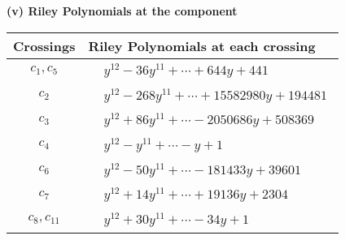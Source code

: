 \documentclass[1p]{elsarticle_modified}
\theoremstyle{definition}
\begin{document}
\newpage\renewcommand{\arraystretch}{1}
\flushleft \textbf{(v) Riley Polynomials at the component}\newline \\
\begin{tabular}{m{50pt}|m{274pt}}
Crossings & \hspace{64pt}Riley Polynomials at each crossing \\
\hline $$\begin{aligned}c_{1},c_{5}\end{aligned}$$&$\begin{aligned}
&y^{12}-36 y^{11}+\cdots+644 y+441
\end{aligned}$\\
\hline $$\begin{aligned}c_{2}\end{aligned}$$&$\begin{aligned}
&y^{12}-268 y^{11}+\cdots+15582980 y+194481
\end{aligned}$\\
\hline $$\begin{aligned}c_{3}\end{aligned}$$&$\begin{aligned}
&y^{12}+86 y^{11}+\cdots-2050686 y+508369
\end{aligned}$\\
\hline $$\begin{aligned}c_{4}\end{aligned}$$&$\begin{aligned}
&y^{12}- y^{11}+\cdots- y+1
\end{aligned}$\\
\hline $$\begin{aligned}c_{6}\end{aligned}$$&$\begin{aligned}
&y^{12}-50 y^{11}+\cdots-181433 y+39601
\end{aligned}$\\
\hline $$\begin{aligned}c_{7}\end{aligned}$$&$\begin{aligned}
&y^{12}+14 y^{11}+\cdots+19136 y+2304
\end{aligned}$\\
\hline $$\begin{aligned}c_{8},c_{11}\end{aligned}$$&$\begin{aligned}
&y^{12}+30 y^{11}+\cdots-34 y+1
\end{aligned}$\\

\end{tabular}
\end{document}
